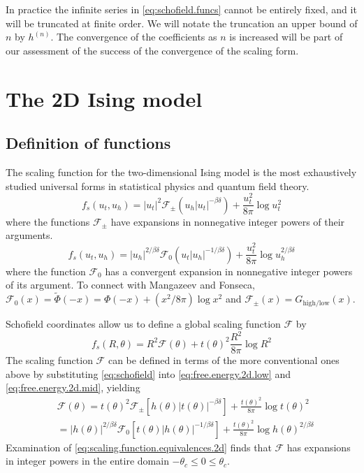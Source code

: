\documentclass[
  aps,
  prb,
  reprint,
  longbibliography,
  floatfix
]{revtex4-2}
\begin{document}
In practice the infinite series in \eqref{eq:schofield.funcs} cannot be
entirely fixed, and it will be truncated at finite order. We will notate the
truncation an upper bound of $n$ by $h^{(n)}$. The convergence of the
coefficients as $n$ is increased will be part of our assessment of the success
of the convergence of the scaling form.

\section{The 2D Ising model}

\subsection{Definition of functions}

The scaling function for the two-dimensional Ising model is the most
exhaustively studied universal forms in statistical physics and quantum field
theory.
\begin{equation} \label{eq:free.energy.2d.low}
  f_s(u_t, u_h)
  = |u_t|^2\mathcal F_{\pm}(u_h|u_t|^{-\beta\delta})
    +\frac{u_t^2}{8\pi}\log u_t^2
\end{equation}
where the functions $\mathcal F_\pm$ have expansions in nonnegative integer powers of their arguments.
\begin{equation} \label{eq:free.energy.2d.mid}
  f_s(u_t, u_h)
  = |u_h|^{2/\beta\delta}\mathcal F_0(u_t|u_h|^{-1/\beta\delta})
    +\frac{u_t^2}{8\pi}\log u_h^{2/\beta\delta}
\end{equation}
where the function $\mathcal F_0$ has a convergent expansion in nonnegative integer powers of its argument.
To connect with Mangazeev and Fonseca, $\mathcal F_0(x)=\tilde\Phi(-x)=\Phi(-x)+(x^2/8\pi) \log x^2$ and $\mathcal F_\pm(x)=G_{\mathrm{high}/\mathrm{low}}(x)$.

Schofield coordinates allow us to define a global scaling function $\mathcal F$ by
\begin{equation} \label{eq:schofield.2d.free.energy}
  f_s(R, \theta) = R^2\mathcal F(\theta) + t(\theta)^2\frac{R^2}{8\pi}\log R^2
\end{equation}
The scaling function $\mathcal F$ can be defined in terms of the more
conventional ones above by substituting \eqref{eq:schofield} into \eqref{eq:free.energy.2d.low} and
\eqref{eq:free.energy.2d.mid}, yielding
\begin{equation} \label{eq:scaling.function.equivalences.2d}
  \begin{aligned}
    &\mathcal F(\theta)
    =t(\theta)^2\mathcal F_\pm\left[h(\theta)|t(\theta)|^{-\beta\delta}\right]
      +\frac{t(\theta)^2}{8\pi}\log t(\theta)^2 \\
    &=|h(\theta)|^{2/\beta\delta}\mathcal F_0\left[t(\theta)|h(\theta)|^{-1/\beta\delta}\right]
      +\frac{t(\theta)^2}{8\pi}\log h(\theta)^{2/\beta\delta}
  \end{aligned}
\end{equation}
Examination of \eqref{eq:scaling.function.equivalences.2d} finds that $\mathcal F$ has expansions in integer powers in the entire domain $-\theta_c\leq0\leq\theta_c$.
\end{document}
